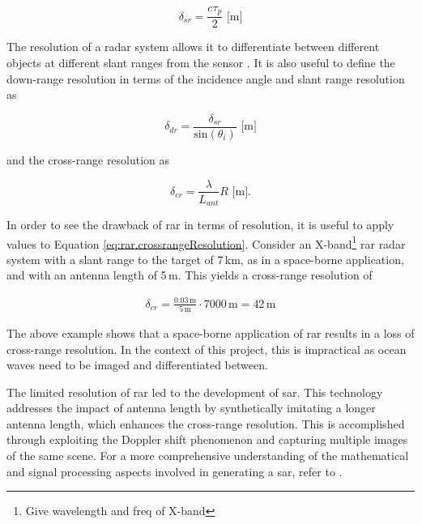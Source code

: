 \begin{equation} \label{eq:rar.slantRangeResolution}
    \delta_{sr} = \frac{c \tau_{p}}{2} \,\, \text{[m]}
\end{equation}

The resolution of a radar system allows it to differentiate between different objects at different slant ranges from the sensor \cite{Moreira2013}. It is also useful to define the down-range resolution in terms of the incidence angle and slant range resolution as

\begin{equation} \label{eq:rar.groundRangeResolution}
    \delta_{dr} = \frac{\delta_{sr}}{\text{sin}(\theta_{i})} \,\, \text{[m]}
\end{equation}

and the cross-range resolution as

\begin{equation} \label{eq:rar.crossrangeResolution}
  \delta_{cr} = \frac{\lambda}{L_{ant}}R \,\, \text{[m].}
\end{equation}

In order to see the drawback of \ac{rar} in terms of resolution, it is useful to apply values to Equation \ref{eq:rar.crossrangeResolution}. Consider an X-band\footnote{Give wavelength and freq of X-band} \ac{rar} radar system with a slant range to the target of 7\,km, as in a space-borne application, and with an antenna length of 5\,m. This yields a cross-range resolution of

\begin{gather*}
    \delta_{cr} = \frac{0.03\,\text{m}}{5\,\text{m}} \cdot 7000\,\text{m} = 42\,\text{m}
\end{gather*}

The above example shows that a space-borne application of \acs{rar} results in a loss of cross-range resolution. In the context of this project, this is impractical as ocean waves need to be imaged and differentiated between.

The limited resolution of \acs{rar} led to the development of \acs{sar}. This technology addresses the impact of antenna length by synthetically imitating a longer antenna length, which enhances the cross-range resolution. This is accomplished through exploiting the Doppler shift phenomenon and capturing multiple images of the same scene. For a more comprehensive understanding of the mathematical and signal processing aspects involved in generating a \acs{sar}, refer to \cite{Cumming2005}.



